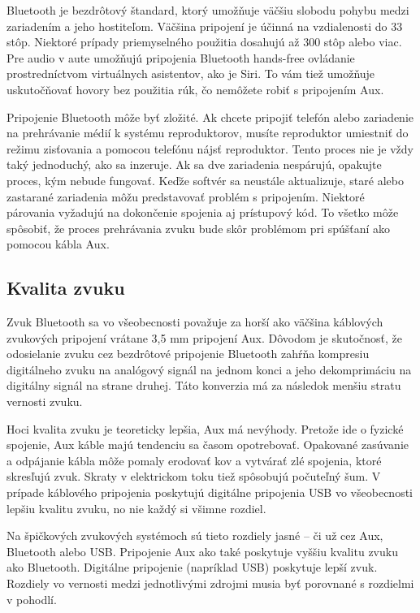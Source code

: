 \documentclass[10pt,twoside,slovak,a4paper]{article}
\begin{document}
Bluetooth je bezdrôtový štandard, ktorý umožňuje väčšiu slobodu pohybu medzi zariadením a jeho hostiteľom. Väčšina pripojení je účinná na vzdialenosti do 33 stôp. Niektoré prípady priemyselného použitia dosahujú až 300 stôp alebo viac. Pre audio v aute umožňujú pripojenia Bluetooth hands-free ovládanie prostredníctvom virtuálnych asistentov, ako je Siri. To vám tiež umožňuje uskutočňovať hovory bez použitia rúk, čo nemôžete robiť s pripojením Aux.\cite{Laukkonen}

Pripojenie Bluetooth môže byť zložité. Ak chcete pripojiť telefón alebo zariadenie na prehrávanie médií k systému reproduktorov, musíte reproduktor umiestniť do režimu zisťovania a pomocou telefónu nájsť reproduktor. Tento proces nie je vždy taký jednoduchý, ako sa inzeruje. Ak sa dve zariadenia nespárujú, opakujte proces, kým nebude fungovať. Keďže softvér sa neustále aktualizuje, staré alebo zastarané zariadenia môžu predstavovať problém s pripojením. Niektoré párovania vyžadujú na dokončenie spojenia aj prístupový kód. To všetko môže spôsobiť, že proces prehrávania zvuku bude skôr problémom pri spúšťaní ako pomocou kábla Aux.\cite{Laukkonen}

\subsection{Kvalita zvuku} \label {kvalita}

Zvuk Bluetooth sa vo všeobecnosti považuje za horší ako väčšina káblových zvukových pripojení vrátane 3,5 mm pripojení Aux. Dôvodom je skutočnosť, že odosielanie zvuku cez bezdrôtové pripojenie Bluetooth zahŕňa kompresiu digitálneho zvuku na analógový signál na jednom konci a jeho dekomprimáciu na digitálny signál na strane druhej. Táto konverzia má za následok menšiu stratu vernosti zvuku.\cite{Laukkonen}

Hoci kvalita zvuku je teoreticky lepšia, Aux má nevýhody. Pretože ide o fyzické spojenie, Aux káble majú tendenciu sa časom opotrebovať. Opakované zasúvanie a odpájanie kábla môže pomaly erodovať kov a vytvárať zlé spojenia, ktoré skresľujú zvuk. Skraty v elektrickom toku tiež spôsobujú počuteľný šum. V prípade káblového pripojenia poskytujú digitálne pripojenia USB vo všeobecnosti lepšiu kvalitu zvuku, no nie každý si všimne rozdiel. \cite{Laukkonen}

Na špičkových zvukových systémoch sú tieto rozdiely jasné – či už cez Aux, Bluetooth alebo USB. Pripojenie Aux ako také poskytuje vyššiu kvalitu zvuku ako Bluetooth. Digitálne pripojenie (napríklad USB) poskytuje lepší zvuk. Rozdiely vo vernosti medzi jednotlivými zdrojmi musia byť porovnané s rozdielmi v pohodlí.\cite{Laukkonen}
\end{document}
